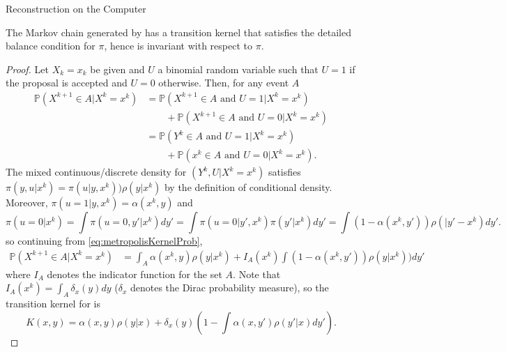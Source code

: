 \begin{chapter}{Reconstruction on the Computer}
\begin{prop} \label{prop:metropolisInvariance}
  The Markov chain generated by  has a transition kernel that satisfies the detailed balance condition for $\pi$, hence is invariant with respect to $\pi$.
\end{prop}
\begin{proof}
Let $X_k=x_k$ be given and $U$ a binomial random variable such that $U=1$ if the proposal is accepted and $U=0$ otherwise. 
Then, for any event $A$ 
\begin{align}
  \mathbb P\left( X^{k+1} \in A | X^k = x^k \right)
    &= \mathbb P\left( X^{k+1} \in A\text{ and } U = 1 |X^k=x^k \right) \nonumber\\
    &\quad\quad+ \mathbb P\left(X^{k+1} \in A\text{ and } U = 0| X^k=x^k \right) \nonumber \\
    &= \mathbb P\left( Y^k \in A\text{ and } U = 1 |X^k=x^k \right) \nonumber\\
    &\quad\quad+ \mathbb P\left(x^k \in A\text{ and } U = 0| X^k=x^k \right). \label{eq:metropolisKernelProb}
\end{align}
The mixed continuous/discrete density for $(Y^k,U|X^k = x^k)$ satisfies $\pi(y,u|x^k) = \pi(u|y,x^k))\rho(y|x^k)$ by the definition of conditional density.  
Moreover, $\pi(u=1|y,x^k) = \alpha(x^k,y)$ 
and 
\begin{equation*}
  \pi(u=0|x^k) = \int \pi(u=0,y'|x^k)dy' = \int \pi(u=0|y',x^k)\pi(y'|x^k)dy' = \int (1-\alpha(x^k,y'))\rho(|y'-x^k)dy'.
\end{equation*}
so continuing from \eqref{eq:metropolisKernelProb},
\begin{align}
  \mathbb P\left( X^{k+1} \in A | X^k = x^k \right)
    &= \int_A \alpha(x^k,y)\rho(y|x^k) + I_A(x^k) \int (1 - \alpha(x^k,y'))\rho(y|x^k))dy'
\end{align}
where $I_A$ denotes the indicator function for the set $A$.
Note that $I_A(x^k) = \int_A \delta_x(y)dy$ ($\delta_x$ denotes the Dirac probability measure), so the transition kernel for  is
\begin{equation} \label{eq:metropolisKernel}
  K(x,y) = \alpha(x,y)\rho(y|x) + \delta_x(y) \left(1 - \int \alpha(x,y')\rho(y'|x)dy'\right).
\end{equation}


\end{proof}
\end{chapter}
